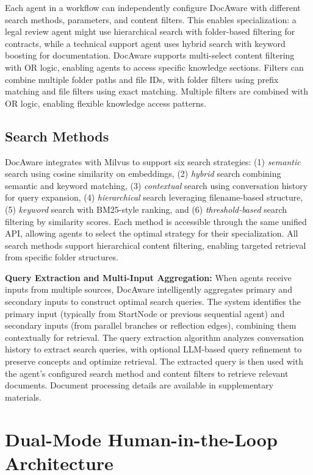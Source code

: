 \documentclass[11pt]{article}
\begin{document}
Each agent in a workflow can independently configure DocAware with different search methods, parameters, and content filters. This enables specialization: a legal review agent might use hierarchical search with folder-based filtering for contracts, while a technical support agent uses hybrid search with keyword boosting for documentation. DocAware supports multi-select content filtering with OR logic, enabling agents to access specific knowledge sections. Filters can combine multiple folder paths and file IDs, with folder filters using prefix matching and file filters using exact matching. Multiple filters are combined with OR logic, enabling flexible knowledge access patterns.

\subsection{Search Methods}

DocAware integrates with Milvus to support six search strategies: (1) \textit{semantic} search using cosine similarity on embeddings, (2) \textit{hybrid} search combining semantic and keyword matching, (3) \textit{contextual} search using conversation history for query expansion, (4) \textit{hierarchical} search leveraging filename-based structure, (5) \textit{keyword} search with BM25-style ranking, and (6) \textit{threshold-based} search filtering by similarity scores. Each method is accessible through the same unified API, allowing agents to select the optimal strategy for their specialization. All search methods support hierarchical content filtering, enabling targeted retrieval from specific folder structures.

\textbf{Query Extraction and Multi-Input Aggregation:} When agents receive inputs from multiple sources, DocAware intelligently aggregates primary and secondary inputs to construct optimal search queries. The system identifies the primary input (typically from StartNode or previous sequential agent) and secondary inputs (from parallel branches or reflection edges), combining them contextually for retrieval. The query extraction algorithm analyzes conversation history to extract search queries, with optional LLM-based query refinement to preserve concepts and optimize retrieval. The extracted query is then used with the agent's configured search method and content filters to retrieve relevant documents. Document processing details are available in supplementary materials.


\section{Dual-Mode Human-in-the-Loop Architecture}
\end{document}
